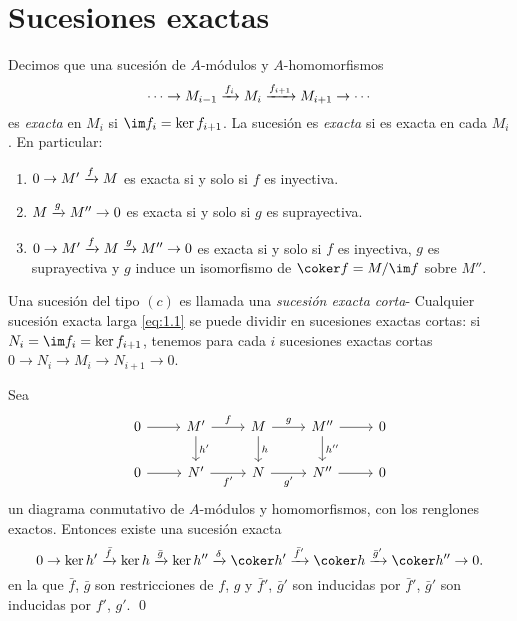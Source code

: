 \section{Sucesiones exactas}

Decimos que una sucesión de $A$-módulos y $A$-homomorfismos
\begin{equation}\label{eq:1.1}%
  \cdots \to M_{i-1}
    \labto{f_i} M_i 
    \labto{f_{i+1}} M_{i+1}
    \to \cdots  
\end{equation}
es \emph{exacta} en $M_i$ si $\im f_i = \ker f_{i+1}$. La sucesión es \emph{exacta} si es exacta en cada $M_i$. En particular:
\begin{enumerate}
  \item $0 \to M' \xrightarrow{f} M $ es exacta si y solo si $f$ es inyectiva.
  \item $M \xrightarrow{g} M'' \to 0$ es exacta si y solo si $g$ es suprayectiva.
  \item $0 \to M' \xrightarrow{f} M \xrightarrow{g} M'' \to 0$ es exacta si y solo si $f$ es inyectiva, $g$ es suprayectiva y $g$ induce un isomorfismo de $\coker f = M / \im f$ sobre $M''$.
\end{enumerate}

Una sucesión del tipo $(c)$ es llamada una \emph{sucesión exacta corta}- Cualquier sucesión exacta larga \eqref{eq:1.1} se puede dividir en sucesiones exactas cortas: si $N_i = \im f_i = \ker f_{i+1}$, tenemos para cada $i$ sucesiones exactas cortas $0 \to N_i \to M_i \to N_{i+1} \to 0$.

\begin{lemma}[de la serpiente]\label{prop:1.5.1}%
  Sea 
  \[
    \begin{tikzcd}
      0 \arrow[r] & M' \arrow[r, "f"] \arrow[d, "h'"] & M \arrow[r, "g"] \arrow[d, "h"] & M'' \arrow[r] \arrow[d, "h''"] & 0 \\
      0 \arrow[r] & N' \arrow[r, "f'"']               & N \arrow[r, "g'"']              & N'' \arrow[r]                  & 0
    \end{tikzcd}
  \]
  un diagrama conmutativo de $A$-módulos y homomorfismos, con los renglones exactos. Entonces existe una sucesión exacta
  \begin{equation}\label{eq:1.5}%
    0 \to \ker h' \labto{\bar f} \ker h \labto{\bar g} \ker h'' \labto{\delta} 
      \coker h' \labto{\bar f'} \coker h \labto{\bar g'} \coker h'' \to 0.
  \end{equation}
  en la que $\bar f$, $\bar g$ son restricciones de $f$, $g$ y $\bar f'$, $\bar g'$ son inducidas por $\bar f'$, $\bar g'$ son inducidas por $f'$, $g'$. \qed
\end{lemma}

